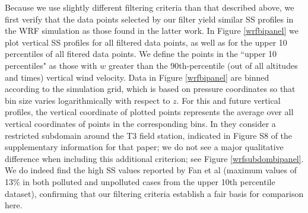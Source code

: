 \documentclass{article}
\begin{document}
Because we use slightly different filtering criteria than that described above, we first verify that the data points selected by our filter yield similar SS profiles in the WRF simulation as those found in the latter work. In Figure \ref{wrfbipanel} we plot vertical SS profiles for all filtered data points, as well as for the upper 10 percentiles of all fitered data points. We define the points in the ``upper 10 percentiles" as those with $w$ greater than the 90th-percentile (out of all altitudes and times) vertical wind velocity. Data in Figure \ref{wrfbipanel} are binned according to the simulation grid, which is based on pressure coordinates so that bin size varies logarithmically with respect to $z$. For this and future vertical profiles, the vertical coordinate of plotted points represents the average over all vertical coordinates of points in the corresponding bins. In \cite{Fan2018} they consider a restricted subdomain around the T3 field station, indicated in Figure S8 of the supplementary information for that paper; we do not see a major qualitative difference when including this additional criterion; see Figure \ref{wrfsubdombipanel}. We do indeed find the high SS values reported by Fan et al (maximum values of 13\% in both polluted and unpolluted cases from the upper 10th percentile dataset), confirming that our filtering criteria establish a fair basis for comparison here.
\end{document}
